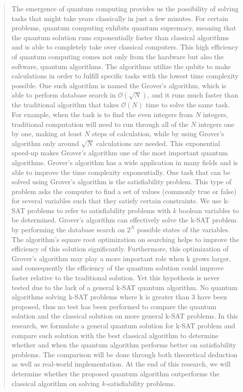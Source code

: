 \documentclass[11pt,journal,onecolumn]{IEEEtran}
\begin{document}
\begin{abstract}
The emergence of quantum computing provides us the possibility of solving tasks that might take years classically in just a few minutes. For certain problems, quantum computing exhibits quantum supremacy, meaning that the quantum solution runs exponentially faster than classical algorithms and is able to completely take over classical computers. This high efficiency of quantum computing comes not only from the hardware but also the software, quantum algorithms. The algorithms utilize the qubits to make calculations in order to fulfill specific tasks with the lowest time complexity possible. One such algorithm is named the Grover's algorithm, which is able to perform database search in $\mathcal{O}(\sqrt{N})$, and it runs much faster than the traditional algorithm that takes $\mathcal{O}(N)$ time to solve the same task. For example, when the task is to find the even integers from $N$ integers, traditional computation will need to run through all of the $N$ integers one by one, making at least $N$ steps of calculation, while by using Grover's algorithm only around $\sqrt{N}$ calculations are needed. This exponential speed-up makes Grover's algorithm one of the most important quantum algorithms. Grover's algorithm has a wide application in many fields and is able to improve the time complexity exponentially. One task that can be solved using Grover's algorithm is the satisfiability problem. This type of problem asks the computer to find a set of values (commonly true or false) for several variables such that they satisfy certain constraints. We use k-SAT problems to refer to satisfiability problems with $k$ boolean variables to be determined. Grover's algorithm can effectively solve the k-SAT problem by performing the database search on $2^N$ possible states of the variables. The algorithm's square root optimization on searching helps to improve the efficiency of this solution significantly. Furthermore, this optimization of Grover's algorithm may play a more important role when k grows larger, and consequently the efficiency of the quantum solution could improve faster relative to the traditional solution. Yet this hypothesis is never tested due to the lack of a general k-SAT quantum algorithm. No quantum algorithms solving k-SAT problems where k is greater than 3 have been proposed, thus no test has been performed to compare the quantum solution and the classical solution on more general k-SAT problems. In this research, we formulate a general quantum solution for k-SAT problem and compare such solution with the best classical algorithm to determine whether and when the quantum algorithm performs better on satisfiability problems. The comparison will be done through both theoretical deduction as well as real-world implementation. At the end of this research, we will determine whether the proposed quantum algorithm outperforms the classical algorithm on solving $k$-satisfiability problems.
\end{abstract}
\end{document}
